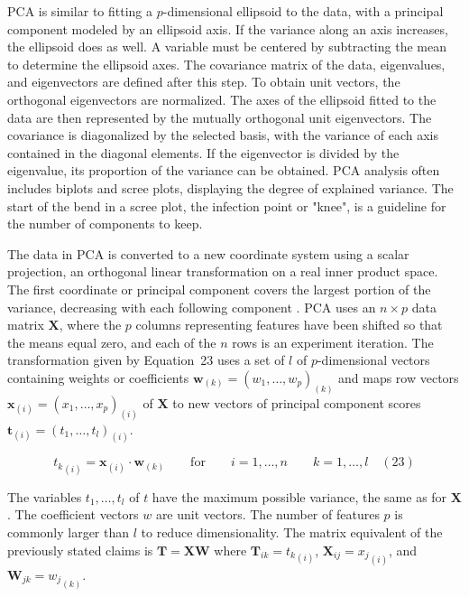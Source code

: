 \documentclass[preprint,12pt]{elsarticle}
\begin{document}
PCA is similar to fitting a $p$-dimensional ellipsoid to the data, with a principal component modeled by an ellipsoid axis. If the variance along an axis increases, the ellipsoid does as well.
A variable must be centered by subtracting the mean to determine the ellipsoid axes. The covariance matrix of the data, eigenvalues, and eigenvectors are defined after this step. To obtain unit vectors, the orthogonal eigenvectors are normalized. The axes of the ellipsoid fitted to the data are then represented by the mutually orthogonal unit eigenvectors. The covariance is diagonalized by the selected basis, with the variance of each axis contained in the diagonal elements. If the eigenvector is divided by the eigenvalue, its proportion of the variance can be obtained.
PCA analysis often includes biplots and scree plots, displaying the degree of explained variance. The start of the bend in a scree plot, the infection point or "knee", is a guideline for the number of components to keep.

The data in PCA is converted to a new coordinate system using a scalar projection, an orthogonal linear transformation on a real inner product space. The first coordinate or principal component covers the largest portion of the variance, decreasing with each following component \cite{jolliffe2002principal}.
PCA uses an $n\times p$ data matrix $\mathbf{X}$, where the $p$ columns representing features have been shifted so that the means equal zero, and each of the $n$ rows is an experiment iteration.
The transformation given by Equation~23 uses a set of $l$ of $p$-dimensional vectors containing weights or coefficients $\mathbf{w}_{\left(k\right)}=(w_{1},\dots ,w_{p})_{\left(k\right)}$ and maps row vectors $\mathbf{x}_{\left(i\right)}=(x_{1},\dots ,x_{p})_{\left(i\right)}$ of $\mathbf{X}$ to new vectors of principal component scores $\mathbf{t}_{\left(i\right)}=(t_{1},\dots ,t_{l})_{\left(i\right)}$.

\begin{equation}
	{t_{k}}_{\left(i\right)}=\mathbf{x}_{\left(i\right)}\cdot \mathbf{w}_{\left(k\right)}\qquad \mathrm{for} \qquad i=1,\dots ,n\qquad k=1,\dots ,l
	\quad\left(23\right)
\end{equation}

The variables $t_{1},\dots ,t_{l}$ of $t$ have the maximum possible variance, the same as for $\mathbf{X}$. The coefficient vectors $w$ are unit vectors. The number of features $p$ is commonly larger than $l$ to reduce dimensionality. The matrix equivalent of the previously stated claims is $\mathbf{T}=\mathbf{X} \mathbf{W}$ where ${\mathbf{T}}_{ik}={t_{k}}_{\left(i\right)}$, ${\mathbf{X}}_{ij}={x_{j}}_{\left(i\right)}$, and ${\mathbf{W}}_{jk}={w_{j}}_{\left(k\right)}$.
\end{document}
